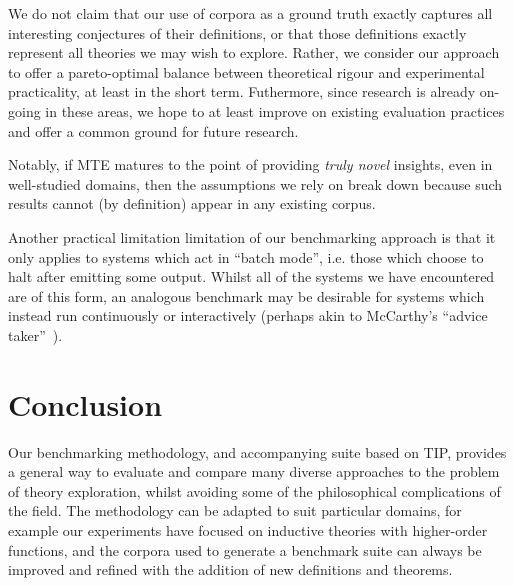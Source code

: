 We do not claim that our use of corpora as a ground truth exactly captures all
interesting conjectures of their definitions, or that those definitions exactly
represent all theories we may wish to explore. Rather, we consider our approach
to offer a pareto-optimal balance between theoretical rigour and experimental
practicality, at least in the short term. Futhermore, since research is already
on-going in these areas, we hope to at least improve on existing evaluation
practices and offer a common ground for future research.

Notably, if MTE matures to the point of providing \emph{truly novel} insights,
even in well-studied domains, then the assumptions we rely on break down because
such results cannot (by definition) appear in any existing corpus.

Another practical limitation limitation of our benchmarking approach is that it
only applies to systems which act in ``batch mode'', i.e. those which choose to
halt after emitting some output. Whilst all of the systems we have encountered
are of this form, an analogous benchmark may be desirable for systems which
instead run continuously or interactively (perhaps akin to McCarthy's
``advice taker''~\cite{McCarthy_Programs59}).






\section{Conclusion}
\label{sec:conclusion}


Our benchmarking methodology, and accompanying suite based on TIP, provides a
general way to evaluate and compare many diverse approaches to the problem of
theory exploration, whilst avoiding some of the philosophical complications of
the field. The methodology can be adapted to suit particular domains, for
example our experiments have focused on inductive theories with higher-order
functions, and the corpora used to generate a benchmark suite can always be
improved and refined with the addition of new definitions and theorems.

